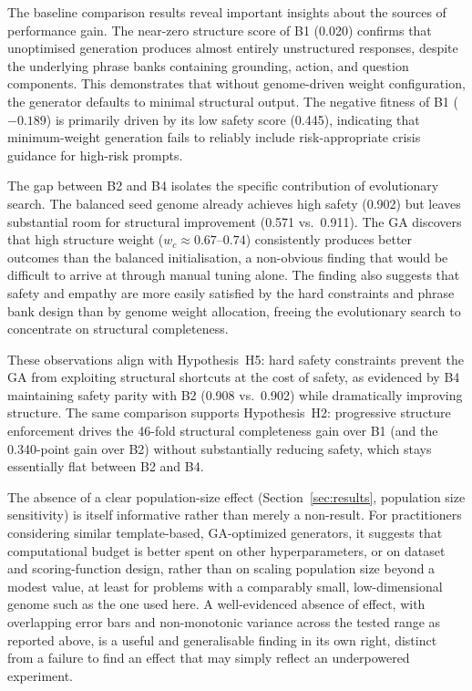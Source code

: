 \documentclass[mathematics,article,xetex,moreauthors]{Definitions/mdpi}
\begin{document}
The baseline comparison results reveal important insights about the sources
of performance gain. The near-zero structure score of B1 (0.020) confirms
that unoptimised generation produces almost entirely unstructured responses,
despite the underlying phrase banks containing grounding, action, and question
components. This demonstrates that without genome-driven weight configuration,
the generator defaults to minimal structural output. The negative fitness of
B1 ($-0.189$) is primarily driven by its low safety score (0.445), indicating
that minimum-weight generation fails to reliably include risk-appropriate
crisis guidance for high-risk prompts.

The gap between B2 and B4 isolates the specific contribution of evolutionary
search. The balanced seed genome already achieves high safety (0.902) but
leaves substantial room for structural improvement (0.571 vs.\ 0.911). The GA
discovers that high structure weight ($w_c \approx 0.67$--$0.74$) consistently
produces better outcomes than the balanced initialisation, a non-obvious
finding that would be difficult to arrive at through manual tuning alone.
The finding also suggests that safety and empathy are more easily satisfied
by the hard constraints and phrase bank design than by genome weight
allocation, freeing the evolutionary search to concentrate on structural
completeness.

These observations align with Hypothesis~H5: hard safety constraints prevent
the GA from exploiting structural shortcuts at the cost of safety, as evidenced
by B4 maintaining safety parity with B2 (0.908 vs.\ 0.902) while dramatically
improving structure. The same comparison supports Hypothesis~H2: progressive
structure enforcement drives the 46-fold structural completeness gain over B1
(and the 0.340-point gain over B2) without substantially reducing safety,
which stays essentially flat between B2 and B4.

The absence of a clear population-size effect (Section~\ref{sec:results},
population size sensitivity) is itself informative rather than merely a
non-result. For practitioners considering similar template-based,
GA-optimized generators, it suggests that computational budget is better
spent on other hyperparameters, or on dataset and scoring-function design,
rather than on scaling population size beyond a modest value, at least for
problems with a comparably small, low-dimensional genome such as the one
used here. A well-evidenced absence of effect, with overlapping error bars
and non-monotonic variance across the tested range as reported above, is a
useful and generalisable finding in its own right, distinct from a failure
to find an effect that may simply reflect an underpowered experiment.
\end{document}
